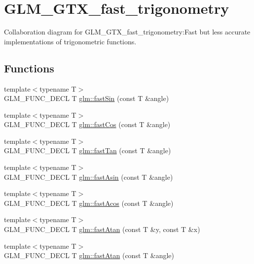 \hypertarget{group__gtx__fast__trigonometry}{
\section{GLM\_\-GTX\_\-fast\_\-trigonometry}
\label{group__gtx__fast__trigonometry}
}


Collaboration diagram for GLM\_\-GTX\_\-fast\_\-trigonometry:Fast but less accurate implementations of trigonometric functions.  
\subsection*{Functions}
\begin{CompactItemize}
\item 
{\footnotesize template$<$typename T$>$ }\\GLM\_\-FUNC\_\-DECL T \hyperlink{group__gtx__fast__trigonometry_g2f7a014f1fb9b16ede8b0cac0beba9f1}{glm::fastSin} (const T \&angle)
\item 
{\footnotesize template$<$typename T$>$ }\\GLM\_\-FUNC\_\-DECL T \hyperlink{group__gtx__fast__trigonometry_g40743124db6dc2a59de72aa81bc1cf93}{glm::fastCos} (const T \&angle)
\item 
{\footnotesize template$<$typename T$>$ }\\GLM\_\-FUNC\_\-DECL T \hyperlink{group__gtx__fast__trigonometry_gd182bf6a962a33e47d5f6daf06ca3d6b}{glm::fastTan} (const T \&angle)
\item 
{\footnotesize template$<$typename T$>$ }\\GLM\_\-FUNC\_\-DECL T \hyperlink{group__gtx__fast__trigonometry_g8c49efe243e7ad6ed58a3bcf07b560a0}{glm::fastAsin} (const T \&angle)
\item 
{\footnotesize template$<$typename T$>$ }\\GLM\_\-FUNC\_\-DECL T \hyperlink{group__gtx__fast__trigonometry_g7f5301bad6bd3a073be8882ac1f4f5d4}{glm::fastAcos} (const T \&angle)
\item 
{\footnotesize template$<$typename T$>$ }\\GLM\_\-FUNC\_\-DECL T \hyperlink{group__gtx__fast__trigonometry_gc6605aad8dce8278938f58b6e68b036a}{glm::fastAtan} (const T \&y, const T \&x)
\item 
{\footnotesize template$<$typename T$>$ }\\GLM\_\-FUNC\_\-DECL T \hyperlink{group__gtx__fast__trigonometry_g0f10c61865500e4cfe86ad070e5d6312}{glm::fastAtan} (const T \&angle)
\end{CompactItemize}


